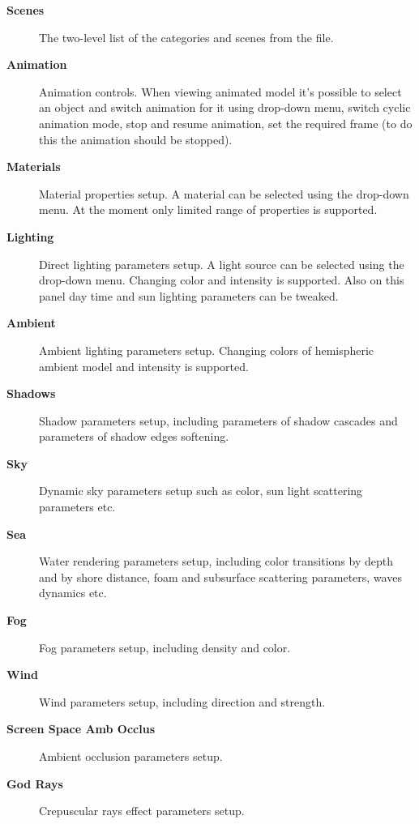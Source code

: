 \documentclass[a4paper,12pt,oneside]{sphinxmanual}
\begin{document}
\begin{description}
\item[{\textbf{Scenes}}] \leavevmode
The two-level list of the categories and scenes from the  file.

\item[{\textbf{Animation}}] \leavevmode
Animation controls. When viewing animated model it's possible to select an object and switch animation for it using drop-down menu, switch cyclic animation mode, stop and resume animation, set the required frame (to do this the animation should be stopped).

\item[{\textbf{Materials}}] \leavevmode
Material properties setup. A material can be selected using the drop-down menu. At the moment only limited range of properties is supported.

\item[{\textbf{Lighting}}] \leavevmode
Direct lighting parameters setup. A light source can be selected using the drop-down menu. Changing color and intensity is supported. Also on this panel day time and sun lighting parameters can be tweaked.

\item[{\textbf{Ambient}}] \leavevmode
Ambient lighting parameters setup. Changing colors of hemispheric ambient model and intensity is supported.

\item[{\textbf{Shadows}}] \leavevmode
Shadow parameters setup, including parameters of shadow cascades and parameters of shadow edges softening.

\item[{\textbf{Sky}}] \leavevmode
Dynamic sky parameters setup such as color, sun light scattering parameters etc.

\item[{\textbf{Sea}}] \leavevmode
Water rendering parameters setup, including color transitions by depth and by shore distance, foam and subsurface scattering parameters, waves dynamics etc.

\item[{\textbf{Fog}}] \leavevmode
Fog parameters setup, including density and color.

\item[{\textbf{Wind}}] \leavevmode
Wind parameters setup, including direction and strength.

\item[{\textbf{Screen Space Amb Occlus}}] \leavevmode
Ambient occlusion parameters setup.

\item[{\textbf{God Rays}}] \leavevmode
Crepuscular rays effect parameters setup.


\end{description}
\end{document}
